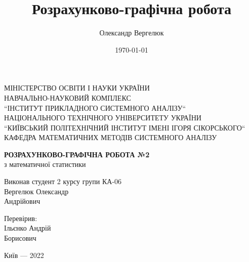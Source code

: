 \documentclass[14pt, a4paper, ukrainian]{extreport}
\title{Розрахунково-графічна робота}
\author{Олександр Вергелюк}
\date{\today}
\begin{document}
	\begin{titlepage}
		\centering
		\vspace{1cm}
		{ МІНІСТЕРСТВО ОСВІТИ І НАУКИ УКРАЇНИ\\
			НАВЧАЛЬНО-НАУКОВИЙ КОМПЛЕКС\\
			``ІНСТИТУТ ПРИКЛАДНОГО СИСТЕМНОГО АНАЛІЗУ``\\
			НАЦІОНАЛЬНОГО ТЕХНІЧНОГО УНІВЕРСИТЕТУ УКРАЇНИ\\
			``КИЇВСЬКИЙ ПОЛІТЕХНІЧНИЙ ІНСТИТУТ ІМЕНІ ІГОРЯ СІКОРСЬКОГО``\\
			КАФЕДРА МАТЕМАТИЧНИХ МЕТОДІВ  СИСТЕМНОГО АНАЛІЗУ\\\par}
		\vspace{5cm}
		\MakeUppercase {\textsc{\textbf{{розрахунково-графічна робота №2}}}}\\
		{з математичної статистики} \\
		\vfill
		\newlength{\ML}
		\settowidth{\ML}{\hspace{3.4cm}}
		\hfill
		\begin{minipage}{0.35\textwidth}
			Виконав студент 2 курсу групи КА-06\\
			Вергелюк Олександр\\ Андрійович
			
			Перевірив: \\
			Ільєнко Андрій\\ Борисович
		\end{minipage}
		\vfill
		\begin{center}
			Київ --- 2022
		\end{center}
	\end{titlepage}
	
\end{document}
